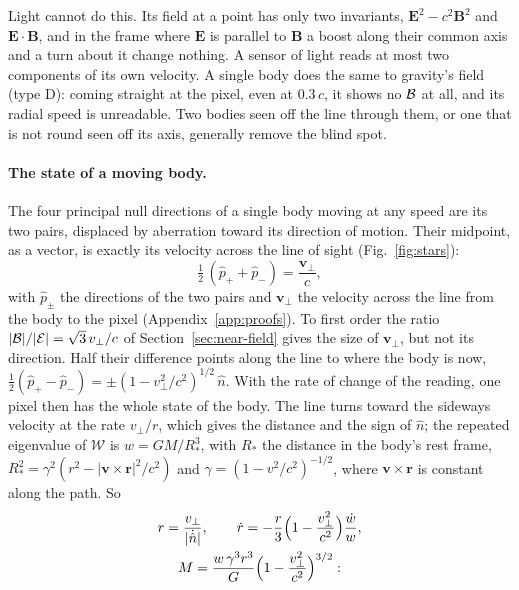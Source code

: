Light cannot do this. Its field at a point has only two invariants,
$\mathbf{E}^2 - c^2\mathbf{B}^2$ and $\mathbf{E}\cdot\mathbf{B}$, and in the frame
where $\mathbf{E}$ is parallel to $\mathbf{B}$ a boost along their common axis
and a turn about it change nothing. A sensor of light reads at most two
components of its own velocity. A single body does the same to gravity's field
(type D): coming straight at the pixel, even at $0.3\,c$, it shows no $\mathcal{B}$ at
all, and its radial speed is unreadable. Two bodies seen off the line through
them, or one that is not round seen off its axis, generally remove the blind spot.

\paragraph{The state of a moving body.} The four principal null directions of a single body moving at any
speed are its two pairs, displaced by aberration toward its direction of motion.
Their midpoint, as a vector, is exactly its velocity across the line of sight
(Fig.~\ref{fig:stars}):
\begin{equation}\label{eq:star-velocity}
\tfrac12\,(\hat p_+ + \hat p_-) = \frac{\mathbf{v}_\perp}{c} ,
\end{equation}
with $\hat p_\pm$ the directions of the two pairs and $\mathbf{v}_\perp$ the
velocity across the line from the body to the pixel
(Appendix~\ref{app:proofs}). To first order the
ratio $|\mathcal{B}|/|\mathcal{E}| = \sqrt3\,v_\perp/c$ of Section~\ref{sec:near-field} gives
the size of $\mathbf v_\perp$, but not its direction. Half their difference points along the line to where the body is now,
$\tfrac12(\hat p_+ - \hat p_-) = \pm(1 - v_\perp^2/c^2)^{1/2}\,\hat n$. With the
rate of change of the reading, one pixel then has the whole state of the body.
The line turns toward the sideways velocity at the rate $v_\perp/r$, which gives
the distance and the sign of $\hat n$; the repeated eigenvalue of $\mathcal W$ is
$w = GM/R_*^3$, with $R_*$ the distance in the body's rest frame,
$R_*^2 = \gamma^2(r^2 - |\mathbf v\times\mathbf r|^2/c^2)$ and
$\gamma = (1 - v^2/c^2)^{-1/2}$, where
$\mathbf v\times\mathbf r$ is constant along the path. So
\begin{equation}\label{eq:moving-state}
\begin{gathered}
r = \frac{v_\perp}{|\dot{\hat n}|}, \qquad
\dot r = -\frac{r}{3}\Bigl(1 - \frac{v_\perp^2}{c^2}\Bigr)\frac{\dot w}{w},\\
M = \frac{w\,\gamma^3 r^3}{G}\Bigl(1 - \frac{v_\perp^2}{c^2}\Bigr)^{3/2}:
\end{gathered}
\end{equation}
